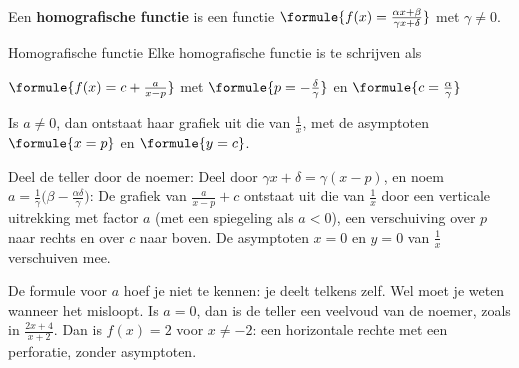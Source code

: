 \begin{theorie}
Een \textbf{\textcolor{accent}{homografische functie}} is een functie $\formule{f(x) = \frac{\alpha x + \beta}{\gamma x + \delta}}$ met $\gamma \neq 0$.

\begin{stelling}{Homografische functie}
Elke homografische functie is te schrijven als

\qquad $\formule{f(x) = c + \frac{a}{x - p}}$ \quad met \quad $\formule{p = -\frac{\delta}{\gamma}}$ \quad en \quad $\formule{c = \frac{\alpha}{\gamma}}$

Is $a \neq 0$, dan ontstaat haar grafiek uit die van $\frac1x$, met de asymptoten $\formule{x = p}$ en $\formule{y = c}$.
\end{stelling}

\begin{bewijs}
Deel de teller door de noemer:
Deel door $\gamma x + \delta = \gamma(x - p)$, en noem $a = \frac{1}{\gamma}\bigl(\beta - \frac{\alpha\delta}{\gamma}\bigr)$:
De grafiek van $\frac{a}{x - p} + c$ ontstaat uit die van $\frac1x$ door een verticale uitrekking met factor $a$ (met een spiegeling als $a < 0$), een verschuiving over $p$ naar rechts en over $c$ naar boven. De asymptoten $x = 0$ en $y = 0$ van $\frac1x$ verschuiven mee.
\end{bewijs}
\end{theorie}

De formule voor $a$ hoef je niet te kennen: je deelt telkens zelf. Wel moet je weten wanneer het misloopt. Is $a = 0$, dan is de teller een veelvoud van de noemer, zoals in $\frac{2x + 4}{x + 2}$. Dan is $f(x) = 2$ voor $x \neq -2$: een horizontale rechte met een perforatie, zonder asymptoten.

